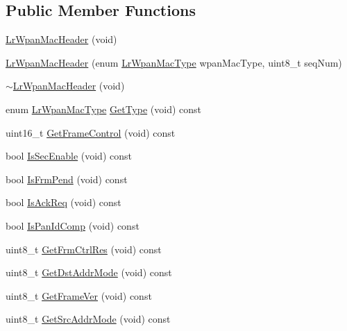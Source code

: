 \subsection*{Public Member Functions}
\begin{DoxyCompactItemize}
\item 
\hyperlink{classns3_1_1LrWpanMacHeader_a24f0e8f775ad044361cbdb59b3c24075}{Lr\+Wpan\+Mac\+Header} (void)
\item 
\hyperlink{classns3_1_1LrWpanMacHeader_a2bbc336dc18f093b01146d708ec900d7}{Lr\+Wpan\+Mac\+Header} (enum \hyperlink{classns3_1_1LrWpanMacHeader_a09363d4738e8ab00b82db8268b65d7a0}{Lr\+Wpan\+Mac\+Type} wpan\+Mac\+Type, uint8\+\_\+t seq\+Num)
\item 
\hyperlink{classns3_1_1LrWpanMacHeader_a6cc5b032f84d99ca6707c42dc12afb09}{$\sim$\+Lr\+Wpan\+Mac\+Header} (void)
\item 
enum \hyperlink{classns3_1_1LrWpanMacHeader_a09363d4738e8ab00b82db8268b65d7a0}{Lr\+Wpan\+Mac\+Type} \hyperlink{classns3_1_1LrWpanMacHeader_a331e6f687e91bd806e29e6d1fbc79db9}{Get\+Type} (void) const 
\item 
uint16\+\_\+t \hyperlink{classns3_1_1LrWpanMacHeader_a9d63cb5defe8f26f6a02062c31d9608b}{Get\+Frame\+Control} (void) const 
\item 
bool \hyperlink{classns3_1_1LrWpanMacHeader_aa134222caa0cb41a83f4216ca772fb27}{Is\+Sec\+Enable} (void) const 
\item 
bool \hyperlink{classns3_1_1LrWpanMacHeader_a898c4a7e13a2aa8d8d5716941bb2d402}{Is\+Frm\+Pend} (void) const 
\item 
bool \hyperlink{classns3_1_1LrWpanMacHeader_ab86bdcc5f99fa760559033dff1afbef5}{Is\+Ack\+Req} (void) const 
\item 
bool \hyperlink{classns3_1_1LrWpanMacHeader_a0d35dae49361fa89aa07a5675d26fc4e}{Is\+Pan\+Id\+Comp} (void) const 
\item 
uint8\+\_\+t \hyperlink{classns3_1_1LrWpanMacHeader_a284a74f96c4c9727ba440543c7766ac1}{Get\+Frm\+Ctrl\+Res} (void) const 
\item 
uint8\+\_\+t \hyperlink{classns3_1_1LrWpanMacHeader_a4f5d04d695e3e500cc89c73300097350}{Get\+Dst\+Addr\+Mode} (void) const 
\item 
uint8\+\_\+t \hyperlink{classns3_1_1LrWpanMacHeader_aa9695d4722a1c995a493b9dcafa24a43}{Get\+Frame\+Ver} (void) const 
\item 
uint8\+\_\+t \hyperlink{classns3_1_1LrWpanMacHeader_a411db47eb714884a45adf78d79eb3304}{Get\+Src\+Addr\+Mode} (void) const 
\item 

\end{DoxyCompactItemize}
